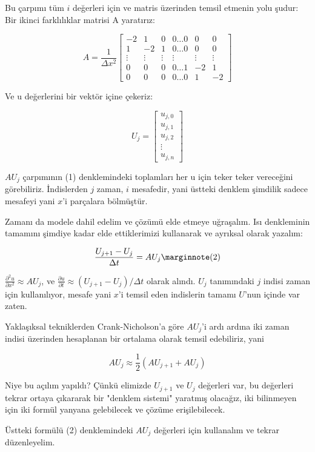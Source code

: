 \documentclass[12pt,fleqn]{article}\usepackage{../../common}
\begin{document}
Bu çarpımı tüm $i$ değerleri için ve matris üzerinden temsil etmenin yolu
şudur: Bir ikinci farklılıklar matrisi A yaratırız:

$$ 
A = \frac{1}{\Delta x^2}
\left[ \begin{array}{ccccccc}
-2 & 1 & 0 & 0 \ldots 0 & 0 & 0 \\
1 & -2 & 1 & 0 \ldots 0 & 0 & 0 \\
\vdots & \vdots & \vdots & \vdots & \vdots & \vdots \\
0 & 0 & 0 & 0 \ldots 1 & -2 & 1 \\
0 & 0 & 0 & 0 \ldots 0 & 1 & -2
\end{array} \right]
 $$

Ve u değerlerini bir vektör içine çekeriz:

$$ U_j =
\left[ \begin{array}{c}
u_{j,0} \\
u_{j,1} \\
u_{j,2} \\
\vdots \\
u_{j,n}
\end{array} \right]
 $$

$AU_j$ çarpımının (1) denklemindeki toplamları her u için teker teker
vereceğini görebiliriz. İndislerden $j$ zaman, $i$ mesafedir, yani üstteki
denklem şimdilik sadece mesafeyi yani $x$'i parçalara bölmüştür.

Zamanı da modele dahil edelim ve çözümü elde etmeye uğraşalım. Isı
denkleminin tamamını şimdiye kadar elde ettiklerimizi kullanarak ve
ayrıksal olarak yazalım:

$$
\frac{U_{j+1}-U_j}{\Delta t} = AU_j 
\mlabel{2}
$$

$\frac{\partial^2u}{\partial x^2} \approx AU_j$, ve $\frac{\partial
  u}{\partial t} \approx (U_{j+1}-U_j) / \Delta t$ olarak
alındı. $U_j$ tanımındaki $j$ indisi zaman için kullanılıyor, mesafe
yani $x$'i temsil eden indislerin tamamı $U$'nun içinde var zaten.

Yaklaşıksal tekniklerden Crank-Nicholson'a göre $AU_j$'i ardı ardına
iki zaman indisi üzerinden hesaplanan bir ortalama olarak temsil
edebiliriz, yani

$$ AU_j \approx \frac{1}{2}(AU_{j+1}+AU_j) $$

Niye bu açılım yapıldı? Çünkü elimizde $U_{j+1}$ ve $U_j$ değerleri var, bu
değerleri tekrar ortaya çıkararak bir "denklem sistemi" yaratmış olacağız, iki
bilinmeyen için iki formül yanyana gelebilecek ve çözüme erişilebilecek. 

Üstteki formülü (2) denklemindeki $AU_j$ değerleri
için kullanalım ve tekrar düzenleyelim.
\end{document}
